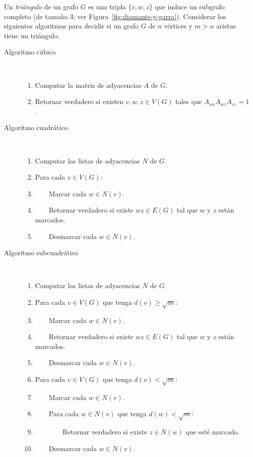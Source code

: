 
 \item Un \emph{triángulo} de un grafo $G$ es una tripla $\{v,w,z\}$ que induce un subgrafo completo (de tamaño $3$; ver Figura~\ref{fig:diamante-y-garra}).  Considerar los siguientes algoritmos para decidir si un grafo $G$ de $n$ vértices y $m > n$ aristas tiene un triángulo.
 \begin{description}
  \item [Algoritmo cúbico] ~
  \begin{enumerate}[label=$\arabic*$.]
   \item Computar la matriz de adyacencias $A$ de $G$.
   \item Retornar verdadero si existen $v, w, z \in V(G)$ tales que $A_{vw} A_{wz}A_{vz} = 1$.
  \end{enumerate}
  \item [Algoritmo cuadrático]  ~
  \begin{enumerate}[label=$\arabic*$.]
   \item Computar las listas de adyacencias $N$ de $G$.
   \item Para cada $v \in V(G)$:
   \item ~~~~Marcar cada $w \in N(v)$.
   \item ~~~~Retornar verdadero si existe $wz \in E(G)$ tal que $w$ y $z$ están marcados.
   \item ~~~~Desmarcar cada $w \in  N(v)$.
  \end{enumerate}
  \item [Algoritmo subcuadrático]  ~
  \begin{enumerate}[label=$\arabic*$.]
   \item Computar las listas de adyacencias $N$ de $G$.
   \item Para cada $v \in V(G)$ que tenga $d(v) \geq \sqrt{m}$:
   \item ~~~~Marcar cada $w \in N(v)$.
   \item ~~~~Retornar verdadero si existe $wz \in E(G)$ tal que $w$ y $z$ están marcados.
   \item ~~~~Desmarcar cada $w \in  N(v)$.
   \item Para cada $v \in V(G)$ que tenga $d(v) < \sqrt{m}$:
   \item ~~~~Marcar cada $w \in N(v)$.
   \item ~~~~Para cada $w \in N(v)$ que tenga $d(w) < \sqrt{m}$:
   \item ~~~~~~~~Retornar verdadero si existe $z \in N(w)$ que esté marcado.
   \item ~~~~Desmarcar cada $w \in N(v)$.
  \end{enumerate}
 \end{description}

